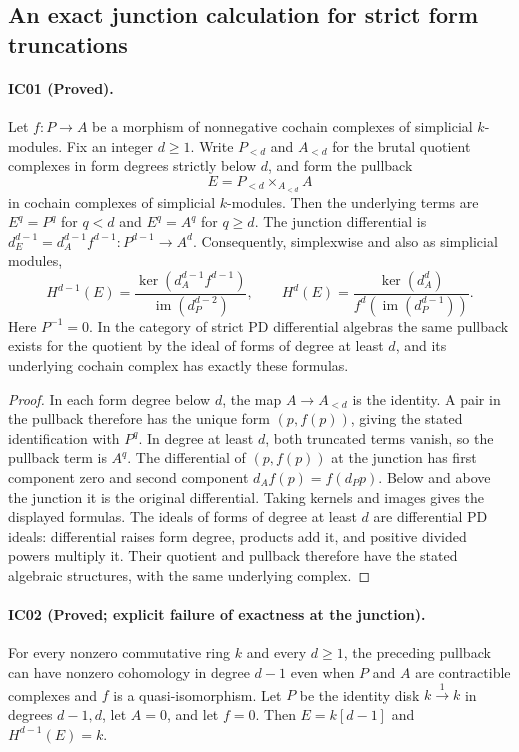 \subsection{An exact junction calculation for strict form truncations}

\paragraph{IC01 (Proved).}
Let $f:P\to A$ be a morphism of nonnegative cochain complexes of
simplicial $k$-modules. Fix an integer $d\geq1$. Write
$P_{<d}$ and $A_{<d}$ for the brutal quotient complexes in form
degrees strictly below $d$, and form the pullback
\[
 E=P_{<d}\mathop{\times}_{A_{<d}} A
\]
in cochain complexes of simplicial $k$-modules. Then the underlying
terms are $E^q=P^q$ for $q<d$ and $E^q=A^q$ for $q\geq d$.
The junction differential is
$d_E^{d-1}=d_A^{d-1}f^{d-1}:P^{d-1}\to A^d$.
Consequently, simplexwise and also as simplicial modules,
\[
 H^{d-1}(E)=
 \frac{\ker(d_A^{d-1}f^{d-1})}
      {\operatorname{im}(d_P^{d-2})},\qquad
 H^d(E)=
 \frac{\ker(d_A^d)}
      {f^d(\operatorname{im}(d_P^{d-1}))}.
\]
Here $P^{-1}=0$. In the category of strict PD differential
algebras the same pullback exists for the quotient by the ideal of
forms of degree at least $d$, and its underlying cochain complex
has exactly these formulas.

\begin{proof}
In each form degree below $d$, the map $A\to A_{<d}$ is the
identity. A pair in the pullback therefore has the unique form
$(p,f(p))$, giving the stated identification with $P^q$.
In degree at least $d$, both truncated terms vanish, so the
pullback term is $A^q$. The differential of $(p,f(p))$ at the
junction has first component zero and second component
$d_Af(p)=f(d_Pp)$. Below and above the junction it is the
original differential. Taking kernels and images gives the
displayed formulas. The ideals of forms of degree at least $d$
are differential PD ideals: differential raises form degree,
products add it, and positive divided powers multiply it.
Their quotient and pullback therefore have the stated algebraic
structures, with the same underlying complex.
\end{proof}

\paragraph{IC02 (Proved; explicit failure of exactness at the junction).}
For every nonzero commutative ring $k$ and every $d\geq1$, the
preceding pullback can have nonzero cohomology in degree $d-1$
even when $P$ and $A$ are contractible complexes and $f$ is a
quasi-isomorphism. Let $P$ be the identity disk
$k\xrightarrow{1}k$ in degrees $d-1,d$, let $A=0$, and let
$f=0$. Then $E=k[d-1]$ and $H^{d-1}(E)=k$.

